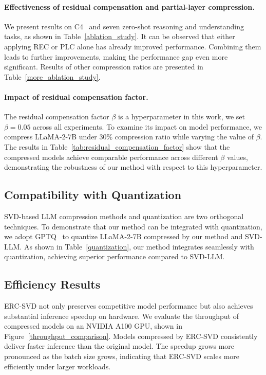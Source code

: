 \paragraph{Effectiveness of residual compensation and partial-layer compression.} 
We present results on C4~\cite{raffel2020exploring} and seven zero-shot reasoning and understanding tasks, as shown in Table~\ref{ablation_study}. It can be observed that either applying REC or PLC alone has already improved performance. Combining them leads to further improvements, making the performance gap even more significant. Results of other compression ratios are presented in Table~\ref{more_ablation_study}.

\paragraph{Impact of residual compensation factor.} 
\label{residual_compensation_factor}
The residual compensation factor $\beta$ is a hyperparameter in this work, we set $\beta = 0.05$ across all experiments. To examine its impact on model performance, we compress LLaMA-2-7B under 30\% compression ratio while varying the value of $\beta$. The results in Table~\ref{tab:residual_compensation_factor} show that the compressed models achieve comparable performance across different $\beta$ values, demonstrating the robustness of our method with respect to this hyperparameter.

\subsection{Compatibility with Quantization}
SVD-based LLM compression methods and quantization are two orthogonal techniques. To demonstrate that our method can be integrated with quantization, we adopt GPTQ~\cite{frantar2022gptq} to quantize LLaMA-2-7B compressed by our method and SVD-LLM. As shown in Table~\ref{quantization}, our method integrates seamlessly with quantization, achieving superior performance compared to SVD-LLM.

\subsection{Efficiency Results}
ERC-SVD not only preserves competitive model performance but also achieves substantial inference speedup on hardware. We evaluate the throughput of compressed models on an NVIDIA A100 GPU, shown in Figure~\ref{throughput_comparison}. Models compressed by ERC-SVD consistently deliver faster inference than the original model. The speedup grows more pronounced as the batch size grows, indicating that ERC-SVD scales more efficiently under larger workloads. 

